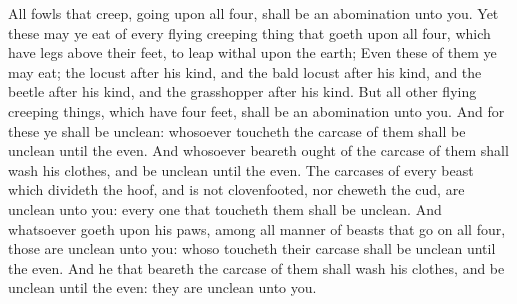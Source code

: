  All fowls that creep, going upon all four, shall be an
abomination unto you.  Yet these may ye eat of every
flying creeping thing that goeth upon all four, which have legs above
their feet, to leap withal upon the earth;  Even these of
them ye may eat; the locust after his kind, and the bald locust after
his kind, and the beetle after his kind, and the grasshopper after his
kind.  But all other flying creeping things, which have
four feet, shall be an abomination unto you.  And for
these ye shall be unclean: whosoever toucheth the carcase of them shall
be unclean until the even.  And whosoever beareth ought
of the carcase of them shall wash his clothes, and be unclean until the
even.  The carcases of every beast which divideth the
hoof, and is not clovenfooted, nor cheweth the cud, are unclean unto
you: every one that toucheth them shall be unclean.  And
whatsoever goeth upon his paws, among all manner of beasts that go on
all four, those are unclean unto you: whoso toucheth their carcase shall
be unclean until the even.  And he that beareth the
carcase of them shall wash his clothes, and be unclean until the even:
they are unclean unto you.

